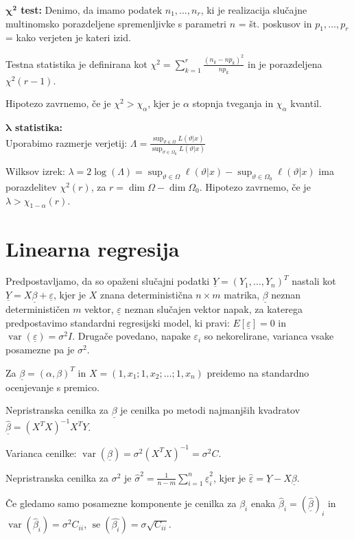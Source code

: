 \documentclass[11pt,a4paper]{amsart}
\theoremstyle{definition} %
\theoremstyle{plain} %
\newcommand{\Y}{\underline{Y}}
\newcommand{\ubeta}{\ensuremath{\underline{\beta}}}
\newcommand{\ueps}{\ensuremath{\underline{\varepsilon}}}
\DeclareMathOperator{\var}{var}
\DeclareMathOperator{\se}{se}
\begin{document}
\textbf{$\mathbf{\boldsymbol\chi^2}$ test:}
Denimo, da imamo podatek $n_1, \dots, n_r$, ki je realizacija slučajne multinomsko porazdeljene
spremenljivke s parametri $n$ = št. poskusov in $p_1, \dots, p_r$ = kako
verjeten je kateri izid.

Testna statistika je definirana kot $\chi^2 = \sum_{k=1}^r\frac{(n_k - n
p_k)^2}{n p_k}$ in je porazdeljena $\chi^2(r-1)$.

Hipotezo zavrnemo, če je $\chi^2 > \chi_\alpha$, kjer je $\alpha$ stopnja
tveganja in $\chi_\alpha$ kvantil.

\textbf{$\boldsymbol \lambda$ statistika:} \\
Uporabimo razmerje verjetij: $\Lambda = \frac{\sup _{\vartheta \in
\Omega}L(\vartheta|x)}{\sup _{\vartheta \in \Omega_0}L(\vartheta|x)}$

Wilksov izrek: $\lambda = 2 \log(\Lambda) = \sup_{\vartheta \in \Omega}
\ell(\vartheta|x) - \sup_{\vartheta \in \Omega_0} \ell(\vartheta|x)$ ima
porazdelitev $\chi^2(r)$, za $r = \dim\Omega - \dim\Omega_0$.
Hipotezo zavrnemo, če je $\lambda > \chi_{1-\alpha}(r)$.

\section*{Linearna regresija}
Predpostavljamo, da so opaženi slučajni podatki $\Y = (Y_1, \dots, Y_n)^T$ nastali kot
$\Y = X \ubeta + \ueps$, kjer je $X$ znana deterministična $n \times m$ matrika, $\ubeta$
neznan determinističen $m$ vektor, $\ueps$ neznan slučajen vektor napak, za katerega
predpostavimo standardni regresijski model, ki pravi: $E[\ueps] = 0$ in
$\var(\ueps) = \sigma^2 I$.  Drugače povedano, napake $\varepsilon_i$ so
nekorelirane, varianca vsake posamezne pa je $\sigma^2$.

Za $\ubeta = (\alpha, \beta)^T$ in $X = (1, x_1; 1, x_2; \dots; 1, x_n)$
preidemo na standardno ocenjevanje s premico.

Nepristranska cenilka za $\ubeta$ je cenilka po metodi najmanjših kvadratov
$\hat{\ubeta} = (X^TX)^{-1}X^TY$.

Varianca cenilke: $\var(\ubeta) = \sigma^2(X^TX)^{-1} = \sigma^2C$.

Nepristranska cenilka za $\sigma^2$ je $\hat{\sigma}^2 = \frac{1}{n-m}
\sum_{i=1}^n \hat{\ueps}_i^2$, kjer je $\hat{\ueps} = \Y - X\ubeta$.

Če gledamo samo posamezne komponente je cenilka za $\beta_i$ enaka
$\hat{\beta}_i = (\hat{\ubeta})_i$ in $\var(\hat{\beta}_i) = \sigma^2C_{ii}$,
$\se(\hat{\beta_i}) = \sigma \sqrt{C_{ii}}$.
\end{document}
